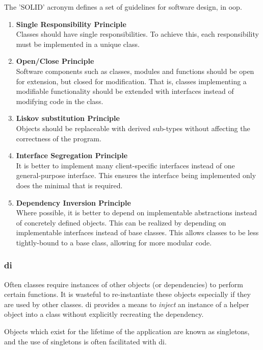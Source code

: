 The 'SOLID' acronym defines a set of guidelines for software design, in \ac{oop}.
\begin{enumerate}
\item \textbf{Single Responsibility Principle}\\
Classes should have single responsibilities. 
To achieve this, each responsibility must be implemented in a unique class.
\item \textbf{Open/Close Principle}\\
Software components such as classes, modules and functions should be open for extension, but closed for modification.
That is, classes implementing a modifiable functionality should be extended with interfaces instead of modifying code in the class.
\item \textbf{Liskov substitution Principle}\\
Objects should be replaceable with derived sub-types without affecting the correctness of the program.
\item \textbf{Interface Segregation Principle}\\
It is better to implement many client-specific interfaces instead of one general-purpose interface.
This ensures the interface being implemented only does the minimal that is required.
\item \textbf{Dependency Inversion Principle}\\
Where possible, it is better to depend on implementable abstractions instead of concretely defined objects.
This can be realized by depending on implementable interfaces instead of base classes.
This allows classes to be less tightly-bound to a base class, allowing for more modular code.
\end{enumerate}
\cite{chebanyuk2016approach}

\subsubsection{\Ac{di}}
Often classes require instances of other objects (or dependencies) to perform certain functions.
It is wasteful to re-instantiate these objects especially if they are used by other classes.
\Ac{di} provides a means to \textit{inject} an instance of a helper object into a class without explicitly recreating the dependency.
\cite{kocsis2017dependency}

Objects which exist for the lifetime of the application are known as singletons, and the use of singletons is often facilitated with \ac{di}.

